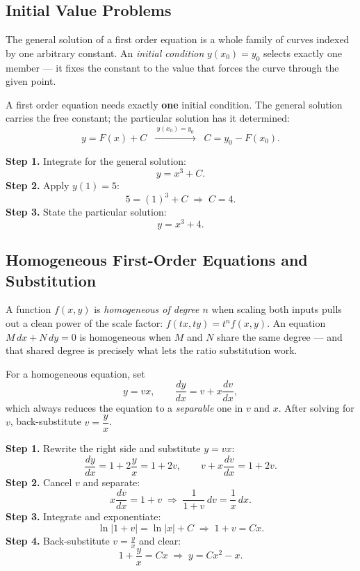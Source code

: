\subsection{Initial Value Problems}

The general solution of a first order equation is a whole family of curves
indexed by one arbitrary constant. An \emph{initial condition} $y(x_0) = y_0$
selects exactly one member --- it fixes the constant to the value that forces
the curve through the given point.

\begin{formulabox}
A first order equation needs exactly \textbf{one} initial condition. The
general solution carries the free constant; the particular solution has it
determined:
\[
    y = F(x) + C \;\;\xrightarrow{\;y(x_0)=y_0\;}\;\; C = y_0 - F(x_0).
\]
\end{formulabox}

\begin{examplebox}[Worked Example 2.3: Solve $\frac{dy}{dx} = 3x^{2}$, $\;y(1)=5$]
\textbf{Step 1.} Integrate for the general solution:
\[ y = x^{3} + C. \]
\textbf{Step 2.} Apply $y(1) = 5$:
\[ 5 = (1)^{3} + C \;\Longrightarrow\; C = 4. \]
\textbf{Step 3.} State the particular solution:
\[ y = x^{3} + 4. \]
\end{examplebox}

\subsection{Homogeneous First-Order Equations and Substitution}

A function $f(x,y)$ is \emph{homogeneous of degree $n$} when scaling both
inputs pulls out a clean power of the scale factor: $f(tx, ty) = t^{n}f(x,y)$.
An equation $M\,dx + N\,dy = 0$ is homogeneous when $M$ and $N$ share the same
degree --- and that shared degree is precisely what lets the ratio
substitution work.

\begin{formulabox}[The Substitution $y = vx$]
For a homogeneous equation, set
\[
    y = vx, \qquad \frac{dy}{dx} = v + x\frac{dv}{dx},
\]
which always reduces the equation to a \emph{separable} one in $v$ and $x$.
After solving for $v$, back-substitute $v = \dfrac{y}{x}$.
\end{formulabox}

\begin{examplebox}[Worked Example 2.4: Solve $\frac{dy}{dx} = \frac{x + 2y}{x}$]
\textbf{Step 1.} Rewrite the right side and substitute $y = vx$:
\[ \frac{dy}{dx} = 1 + 2\frac{y}{x} = 1 + 2v, \qquad v + x\frac{dv}{dx} = 1 + 2v. \]
\textbf{Step 2.} Cancel $v$ and separate:
\[ x\frac{dv}{dx} = 1 + v \;\Longrightarrow\; \frac{1}{1+v}\,dv = \frac{1}{x}\,dx. \]
\textbf{Step 3.} Integrate and exponentiate:
\[ \ln|1+v| = \ln|x| + C \;\Longrightarrow\; 1 + v = Cx. \]
\textbf{Step 4.} Back-substitute $v = \frac{y}{x}$ and clear:
\[ 1 + \frac{y}{x} = Cx \;\Longrightarrow\; y = Cx^{2} - x. \]
\end{examplebox}

